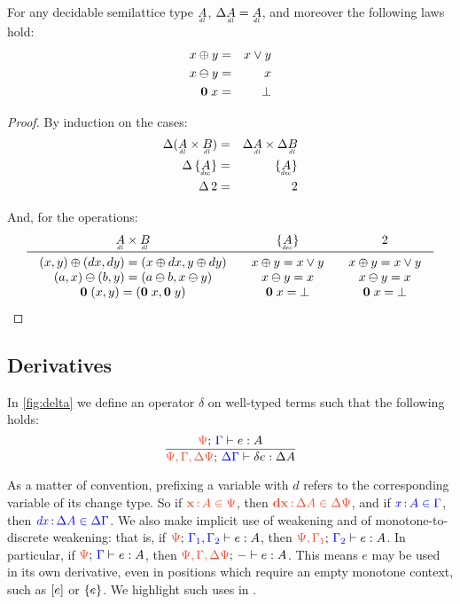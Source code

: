 \documentclass{rntz}
\newcommand{\preserve}[1]{{\color{ForestGreen}{#1}}}
\begin{document}
\begin{lemma}\label{lemma:dl-boring}
  For any decidable semilattice type $\eqlat{A}$, $\Ch \eqlat{A} = \eqlat{A}$,
  and moreover the following laws hold:
  \begin{eqnarray*}
    x \oplus y &=& x \vee y\\
    x \ominus y &=& x\\
    \mathbf{0}\; x &=& \bot
  \end{eqnarray*}
\end{lemma}
\begin{proof}
  By induction on the cases:
  \begin{eqnarray*}
    \Ch(\eqlat{A} \x \eqlat{B}) &=& \Ch \eqlat{A} \x \Ch \eqlat{B}\\
    \Ch\thinspace \Seteq{A} &=& \Seteq{A}\\
    \Ch\thinspace \tbool &=& \tbool
  \end{eqnarray*}

  And, for the operations:
  \[\arraycolsep=1em
  \begin{array}{ccc}
    \eqlat{A} \x \eqlat{B} & \Set{\eq{A}} & \tbool\\
    \midrule
    (x,y) \oplus (dx,dy) = (x \oplus dx, y \oplus dy)
    & x \oplus y = x \vee y
    & x \oplus y = x \vee y
    \\
    (a,x) \ominus (b,y) = (a \ominus b, x \ominus y)
    & x \ominus y = x
    & x \ominus y = x
    \\
    \zero\; (x,y) = (\zero\; x, \zero\; y)
    & \zero\; x = \unit
    & \zero\; x = \unit
  \end{array}
  \]
\end{proof}


\subsection{Derivatives}

In \cref{fig:delta} we define an operator $\delta$ on well-typed terms such that
the following holds:
\[
\infer{\J{\GP,\GG,\Ch\GP}{\Ch\GG}{\delta e}{\Ch A}}
      {\J{\GP}{\GG}{e}{A}}
\]

As a matter of convention, prefixing a variable with $d$ refers to the corresponding variable of its change type.
%
So if $\dt{\d{x} \of A \in \GP}$, then $\dt{\d{dx} \of \Ch A \in \Ch \GP}$, and if ${\color{blue}{\ensuremath{\mathit{{\color{blue}{x}}}} \,{:}\,A \in \Gamma}}$, then ${\color{blue}{\ensuremath{\mathit{{\color{blue}{dx}}}} \,{:}\,\Delta A \in \Delta\Gamma}}$.
%
We also make implicit use of weakening and of monotone-to-discrete weakening: that is, if $\J{\GP}{\GG_1,\GG_2}{e}{A}$, then $\J{\GP,\GG_1}{\GG_2}{e}{A}$.
%
In particular, if $\J{\GP}{\GG}{e}{A}$, then $\J{\GP,\GG,\Ch\GP}{-}{e}{A}$.
%
This means $e$ may be used in its own derivative, even in positions which require an empty monotone context, such as $[{e}]$ or $\{{e}\}$.
%
We highlight such uses in \preserve{green}.
\end{document}
